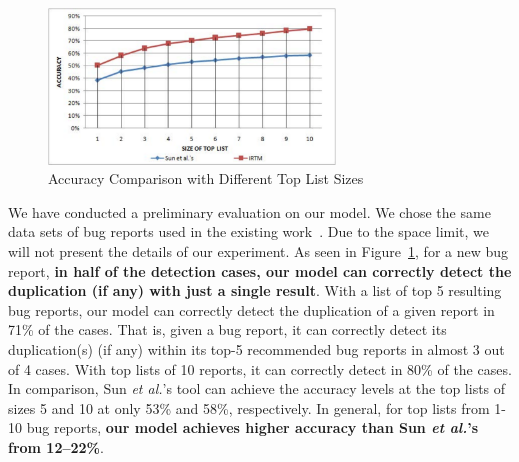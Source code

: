 
\begin{figure}[t]
\centering
\includegraphics[width=3in]{eclipse3}
\caption{Accuracy Comparison with Different Top List Sizes}
\label{eclipse}
\end{figure}

We have conducted a preliminary evaluation on our model.
We chose the same data sets of bug reports used in
the existing work~\cite{davidlo10}. Due to the space limit, we will
not present the details of our experiment.
As seen in Figure~\ref{eclipse}, for a new bug report, {\bf in half of
  the detection cases, our model can correctly detect the duplication
  (if any) with just a single result}. With a list of top 5 resulting
bug reports, our model can correctly detect the duplication of a given
report in 71\% of the cases. That is, given a bug report, it can
correctly detect its duplication(s) (if any) within its top-5
recommended bug reports in almost 3 out of 4 cases. With top lists of
10 reports, it can correctly detect in 80\% of the cases. In
comparison, Sun {\em et al.}'s tool can achieve the accuracy levels at
the top lists of sizes 5 and 10 at only 53\% and 58\%,
respectively. In general, for top lists from 1-10 bug reports, {\bf
  our model achieves higher accuracy than Sun {\em et al.}'s from
  12--22\%}.



